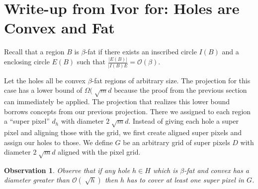 \documentclass[a4paper,UKenglish,cleveref]{lipics-v2019}
\newtheorem{observation}{Observation}
\begin{document}
\section{Write-up from Ivor for: Holes are Convex and Fat}



Recall that a region $B$ is $\beta$-fat if there exists an inscribed circle $I(B)$ and a enclosing circle $E(B)$ such that $\frac{|E(B)|}{|I(B)E} = \mathcal{O}(\beta)$.

Let the holes all be convex $\beta$-fat regions of arbitrary size. The projection for this case has a lower bound of $\Omega(\sqrt[]{m}d$ because the proof from the previous section can immediately be applied. The projection that realizes this lower bound borrows concepts from our previous projection. There we assigned to each region a ``super pixel'' $d_h$ with diameter $2\sqrt[]{m}d$. Instead of giving each hole a super pixel and aligning those with the grid, we first create aligned super pixels and assign our holes to those. We define $G$ be an arbitrary grid of super pixels $D$ with diameter $2\sqrt[]{m}d$ aligned with the pixel grid.

\begin{observation}
\label{obs:covering}
Observe that if any hole $h \in H$ which is $\beta$-fat and convex has a diameter greater than $\mathcal{O}(\sqrt[]{h})$ then $h$ has to cover at least one super pixel in $G$.
\end{observation}
\end{document}
